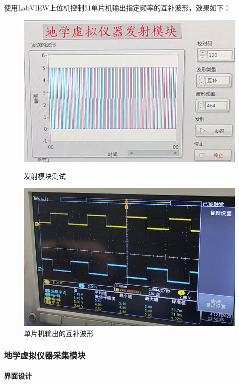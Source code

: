 \documentclass[UTF8]{article}
\begin{document}
使用LabVIEW上位机控制51单片机输出指定频率的互补波形，效果如下：
\begin{figure}[htbp]
	\centering
	\begin{minipage}{0.49\linewidth}
		\centering
		\includegraphics[width=0.9\linewidth]{figure/发射模块测试.png}
		\caption{发射模块测试}
		\label{label1} %
	\end{minipage}
	\begin{minipage}{0.49\linewidth}
		\centering
		\includegraphics[width=0.9\linewidth]{figure/互补波形.png}
		\caption{单片机输出的互补波形}
		\label{label2} %
	\end{minipage}
\end{figure}


\subsubsection{地学虚拟仪器采集模块}
\paragraph{界面设计}~{}
\end{document}
